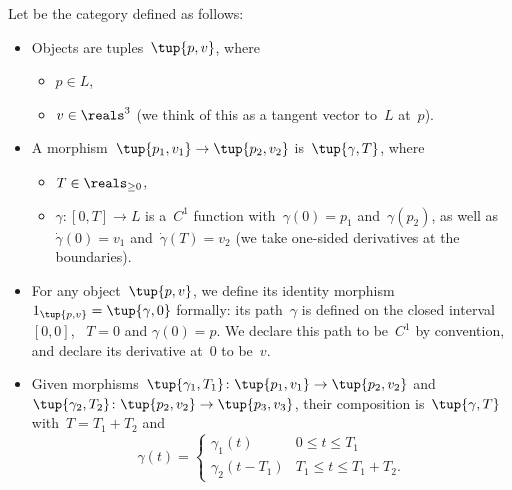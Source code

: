 \begin{definition}[\Berg]
    \label{def:Berg}
    Let \Berg be the category defined as follows:
    \begin{itemize}
        \item Objects are tuples~$\tup{p,v}$, where
        \begin{itemize}
            \item $p \in L$,
            \item $v \in \reals^3$ (we think of this as a tangent vector to~$L$ at~$p$).
        \end{itemize}

        \item A morphism~$\tup{p_1, v_1} \to \tup{p_2, v_2}$ is~$\tup{\gamma, T}$,
        where
        \begin{itemize}
            \item $T \in \reals_{\geq 0}$,
            \item $\gamma \colon [0, T] \to L$ is a~$C^1$ function with~$\gamma(0)=p_1$ and~$\gamma(p_2)$, as well as~$\dot \gamma(0) = v_1$ and~$\dot \gamma(T) = v_2$  (we take one-sided derivatives at the boundaries).
        \end{itemize}
        \item For any object~$\tup{p, v}$, we define its identity morphism~$1_{\tup{p,v}} = \tup{\gamma, 0}$ formally: its path~$\gamma$ is defined on the closed interval~$[0,0]$, ~$T=0$ and $\gamma(0) = p$. We declare this path to be~$C^1$ by convention, and declare its derivative at~$0$ to be~$v$.

        \item Given morphisms~$\tup{\gamma_1, T_1}\colon \tup{p_1, v_1} \to \tup{p_2, v_2}$ and~$\tup{\gamma_2, T_2}\colon \tup{p_2, v_2} \to \tup{p_3, v_3}$, their composition is~$\tup{\gamma, T}$ with~$T = T_1 + T_2$ and
        \begin{equation}
            \gamma(t) = \begin{cases}
                            \gamma_1(t) &0 \leq t \leq T_1 \\
                            \gamma_2(t - T_1) & T_1 \leq t \leq T_1 + T_2.
            \end{cases}
        \end{equation}
    \end{itemize}
\end{definition}



